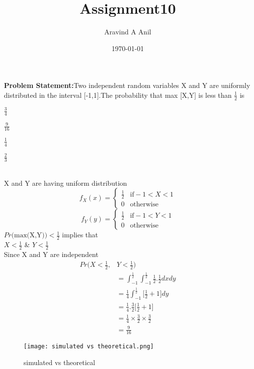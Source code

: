 \documentclass[11pt,a4paper,twocolumn]{article}
\title{Assignment10}
\author{Aravind A Anil}
\date{\today}
\begin{document}
\maketitle

\textbf{Problem Statement:}Two independent random variables X and Y
are uniformly distributed in the interval [-1,1].The probability that max [X,Y] is less than $\frac{1}{2}$ is\\[5pt]
\begin{enumerate*}[label=\alph*)]
    \item $\frac{3}{4}$\hspace{.5cm}
    \item $\frac{9}{16}$\hspace{.5cm}
    \item $\frac{1}{4}$\hspace{.5cm}
    \item $\frac{2}{3}$\hspace{.5cm}
\end{enumerate*}\\[5pt]
X and Y are having uniform distribution\\
\begin{equation*}
  f_{X}(x)=
\begin{cases}
\frac{1}{2} & \text{if} -1<X<1\\
0 & \text{otherwise}
\end{cases}
\end{equation*}
\begin{equation*}
     f_{Y}(y)=
     \begin{cases}
     \frac{1}{2} & \text{if} -1<Y<1\\
     0 & \text{otherwise}
     \end{cases}
\end{equation*}
$Pr\Big(\text{max(X,Y)}\Big)<\frac{1}{2}$ implies that\\[5pt]
$X<\frac{1}{2}$ \& $Y<\frac{1}{2}$\\
Since X and Y are independent
\begin{align*}
    Pr\Bigg(X<\frac{1}{2},&Y<\frac{1}{2}\Bigg)\\
    &=\int_{-1}^{\frac{1}{2}}\int_{-1}^{\frac{1}{2}}\frac{1}{2}.\frac{1}{2}dxdy\\
    &=\frac{1}{4}\int_{-1}^{\frac{1}{2}}\Big[\frac{1}{2}+1\Big]dy\\
    &=\frac{1}{4}.\frac{3}{2}\Big[\frac{1}{2}+1\Big]\\
    &=\frac{1}{4}\times\frac{3}{2}\times\frac{3}{2}\\
    &=\frac{9}{16}
\end{align*}
\begin{figure}
    \centering
    \texttt{[image: simulated vs theoretical.png]}
    \caption{simulated vs theoretical}
    \label{fig:my_label}
\end{figure}
\end{document}
